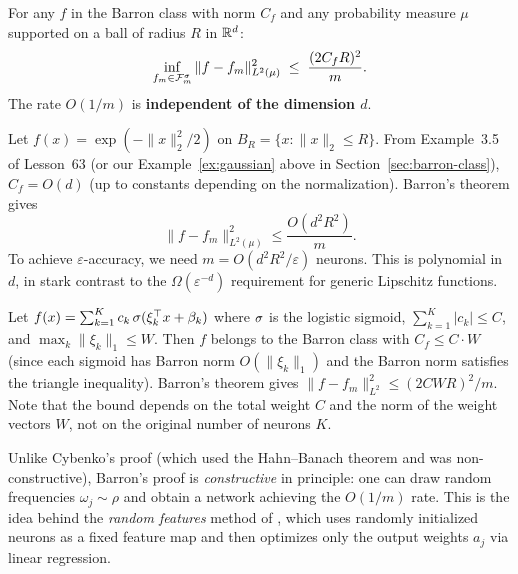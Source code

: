 \documentclass[11pt,a4paper]{article}
\begin{document}
\begin{keyresult}[title={Barron's Dimension-Free Approximation Rate}]
For any $f$ in the Barron class with norm $C_f$ and any probability
measure $\mu$ supported on a ball of radius $R$ in $\mathbb{R}^d$:
\[
  \inf_{f_m \in \mathcal{F}_m^{\sigma}}
  \|f - f_m\|_{L^2(\mu)}^2 \;\le\; \frac{(2C_fR)^2}{m}.
\]
The rate $O(1/m)$ is \textbf{independent of the dimension $d$}.
\end{keyresult}

\begin{example}
\label{ex:gaussian-approx}
Let $f(x) = \exp(-\|x\|_2^2/2)$ on $B_R = \{x : \|x\|_2 \le R\}$.
From Example~3.5 of Lesson~63 (or our Example~\ref{ex:gaussian} above in
Section~\ref{sec:barron-class}), $C_f = O(d)$ (up to constants depending
on the normalization).  Barron's theorem gives
\[
  \|f - f_m\|_{L^2(\mu)}^2 \le \frac{O(d^2 R^2)}{m}.
\]
To achieve $\varepsilon$-accuracy, we need $m = O(d^2 R^2 /
\varepsilon)$ neurons.  This is polynomial in $d$, in stark contrast
to the $\Omega(\varepsilon^{-d})$ requirement for generic Lipschitz
functions.
\end{example}

\begin{example}
\label{ex:sigmoid-combination}
Let $f(x) = \sum_{k=1}^K c_k \, \sigma(\xi_k^\top x + \beta_k)$
where $\sigma$ is the logistic sigmoid, $\sum_{k=1}^K |c_k| \le C$,
and $\max_k \|\xi_k\|_1 \le W$.  Then $f$ belongs to the Barron class
with $C_f \le C \cdot W$ (since each sigmoid has Barron norm
$O(\|\xi_k\|_1)$ and the Barron norm satisfies the triangle inequality).
Barron's theorem gives $\|f - f_m\|_{L^2}^2 \le (2CWR)^2/m$.  Note
that the bound depends on the total weight $C$ and the norm of the
weight vectors $W$, not on the original number of neurons $K$.
\end{example}

\begin{remark}
\label{rem:barron-constructive}
Unlike Cybenko's proof (which used the Hahn--Banach theorem and was
non-constructive), Barron's proof is \emph{constructive} in principle: one
can draw random frequencies $\omega_j \sim \rho$ and obtain a network
achieving the $O(1/m)$ rate.  This is the idea behind the
\emph{random features} method of \citet{rahimi2008}, which uses randomly
initialized neurons as a fixed feature map and then optimizes only the
output weights $a_j$ via linear regression.
\end{remark}
\end{document}
